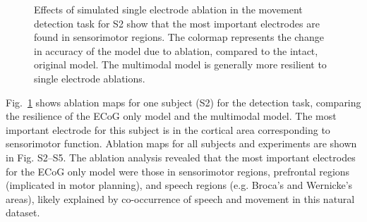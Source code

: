 \documentclass[letterpaper]{article} %
\begin{document}
\begin{table}[h]
\centering
\caption{ECoG deep model vs. SVM with spectral features
\label{tab:svm}
}
\end{table}

\begin{figure}

\caption{Effects of simulated single electrode ablation in the movement detection task for S2 show that the most important electrodes are found in sensorimotor regions. The colormap represents the change in accuracy of the model due to ablation, compared to the intact, original model.
The multimodal model is generally more resilient to single electrode ablations.}
\label{fig:ablate}
\end{figure}

Fig.~\ref{fig:ablate} shows ablation maps for one subject (S2) for the detection task, comparing the resilience of the ECoG only model and the multimodal model. The most important electrode for this subject is in the cortical area corresponding to sensorimotor function. Ablation maps for all subjects and experiments are shown in Fig. S2--S5. The ablation analysis revealed that the most important electrodes for the ECoG only model were those in sensorimotor regions, prefrontal regions (implicated in motor planning), and speech regions (e.g. Broca's and Wernicke's areas), likely explained by co-occurrence of speech and movement in this natural dataset. 
\end{document}
